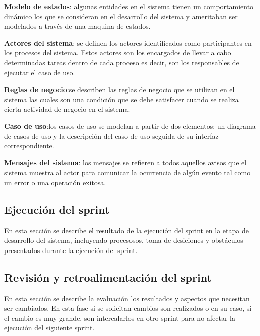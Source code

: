     \begin{description}
        \item  \textbf{Modelo de estados}: algunas entidades en el sistema  tienen un comportamiento dinámico los que se consideran en el desarrollo del sistema 
        y ameritaban ser modelados a través de una maquina de estados.

        \item  \textbf{Actores del sistema}: se definen los actores identificados como participantes en los procesos del sistema. 
        Estos actores son los encargados de llevar a cabo determinadas tareas dentro de cada proceso es decir, son 
        los responsables de ejecutar el caso de uso.
    
        \item  \textbf{Reglas de negocio}:se describen las reglas de negocio que se utilizan en el sistema las cuales son una condición que se debe satisfacer cuando 
        se realiza cierta actividad de negocio en el sistema.

        \item  \textbf{Caso de uso}:los casos de uso se modelan a partir de dos elementos: un diagrama de casos de uso y la descripción del caso de uso seguida 
        de su interfaz correspondiente.

        \item  \textbf{Mensajes del sistema}: los mensajes se refieren a todos aquellos avisos que el sistema muestra al actor para comunicar la ocurrencia de algún 
        evento tal como un error o una operación exitosa. 
    \end{description}
    

\subsection{Ejecución del sprint}
    En esta sección  se describe el resultado de la ejecución del sprint en la etapa de desarrollo del sistema, incluyendo 
    procesosos, toma de desiciones y obstáculos presentados durante la ejecución del sprint.

\subsection{Revisión y retroalimentación del sprint}
    En esta sección  se describe la evaluación los resultados y aspectos que necesitan ser cambiados.
    En esta fase si se solicitan cambios son realizados o en su caso, si el cambio es muy grande, son intercalarlos en otro
    sprint para no afectar la ejecución del siguiente sprint.
    
    


